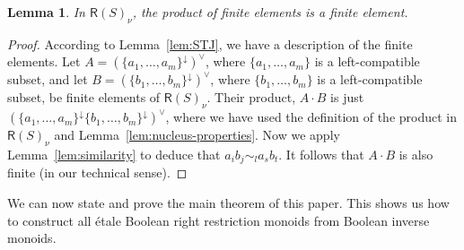 \documentclass[a4paper]{amsart}
\newtheorem{lemma}[theorem]{Lemma}
\begin{document}
\begin{lemma}\label{lem:tucker} 
In  $\mathsf{R}(S)_{\nu}$, the product of finite elements is a finite element.
\end{lemma}
\begin{proof} According to Lemma~\ref{lem:STJ},
we have a description of the finite elements.
Let $A = (\{a_{1}, \ldots, a_{m}\}^{\downarrow})^{\vee}$,
where $\{a_{1}, \ldots, a_{m}\}$ is a left-compatible subset,
and let 
$B = (\{b_{1}, \ldots, b_{m}\}^{\downarrow})^{\vee}$,
where $\{b_{1}, \ldots, b_{m}\}$ is a left-compatible subset,
be finite elements of $\mathsf{R}(S)_{\nu}$.
Their product, $A \cdot B$ is just
$(\{a_{1}, \ldots, a_{m}\}^{\downarrow}\{b_{1}, \ldots, b_{m}\}^{\downarrow})^{\vee}$,
where we have used the definition of the product in $\mathsf{R}(S)_{\nu}$
and Lemma~\ref{lem:nucleus-properties}.
Now we apply Lemma~\ref{lem:similarity}
to deduce that $a_{i}b_{j} \sim_{l} a_{s}b_{t}$.
It follows that $A \cdot B$ is also finite (in our technical sense). 
\end{proof}



We can now state and prove the main theorem of this paper.
This shows us how to construct all \'etale Boolean right restriction monoids from Boolean inverse monoids.
\end{document}
